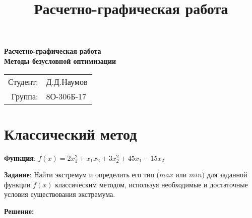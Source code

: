 \documentclass{article}
\title{Расчетно-графическая работа}
\date{}
\begin{document}
\begin{titlepage}

\vspace{100pt}
\begin{center}
    \huge \textbf{Расчетно-графическая работа} \\
    \vspace{50pt}
    \huge \textbf{Методы безусловной оптимизации}
\end{center}
\begin{flushright}

\vspace{350pt}
\begin{tabular}{rl}
     \Large Студент: & \Large Д.Д.Наумов \\
     \Large Группа: & \Large 8О-306Б-17 \\
\end{tabular}
\end{flushright}
\end{titlepage}

\setcounter{section}{0}

\section{Классический метод}

\textbf{Функция}: $f(x) = 2x_1^2 + x_1x_2 + 3x_2^2 + 45x_1 - 15x_2$

\textbf{Задание}: Найти экстремум и определить его тип ($max$ или $min$) для заданной функции $f(x)$ классическим методом, используя  необходимые и достаточные условия существования экстремума.

\textbf{Решение:}
\end{document}
